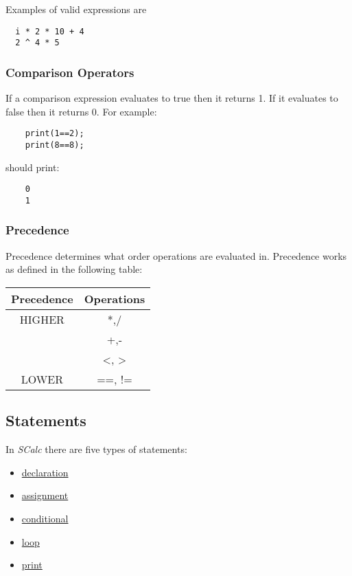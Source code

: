 \documentclass{article}
\begin{document}
Examples of valid expressions are
\begin{lstlisting}
  i * 2 * 10 + 4
  2 ^ 4 * 5
\end{lstlisting}

\subsubsection{Comparison Operators}
If a comparison expression evaluates to true then it returns 1. If it evaluates to false then it
returns 0. For example:
\begin{lstlisting}
	print(1==2);
	print(8==8);
\end{lstlisting}
should print:
\begin{lstlisting}
	0
	1
\end{lstlisting}

\subsubsection{Precedence}
Precedence determines what order operations are evaluated in. Precedence works as defined in the
following table:
\begin{center}
	\begin{tabular}{|c|c|}
	\hline
	\textbf{Precedence} & \textbf{Operations} \\
	\hline
	HIGHER
	& *,/ \\
	& +,- \\
	& <, > \\
	LOWER & ==, != \\
	\hline
	\end{tabular}
\end{center}

\subsection {Statements}

In \textit{SCalc} there are five types of statements:

\begin {itemize}
	\item \hyperref[sssec:declaration]{declaration}
	\item \hyperref[sssec:assignment]{assignment}
	\item \hyperref[sssec:conditional]{conditional}
	\item \hyperref[sssec:loop]{loop}
	\item \hyperref[sssec:print]{print}

\end {itemize}
\end{document}

